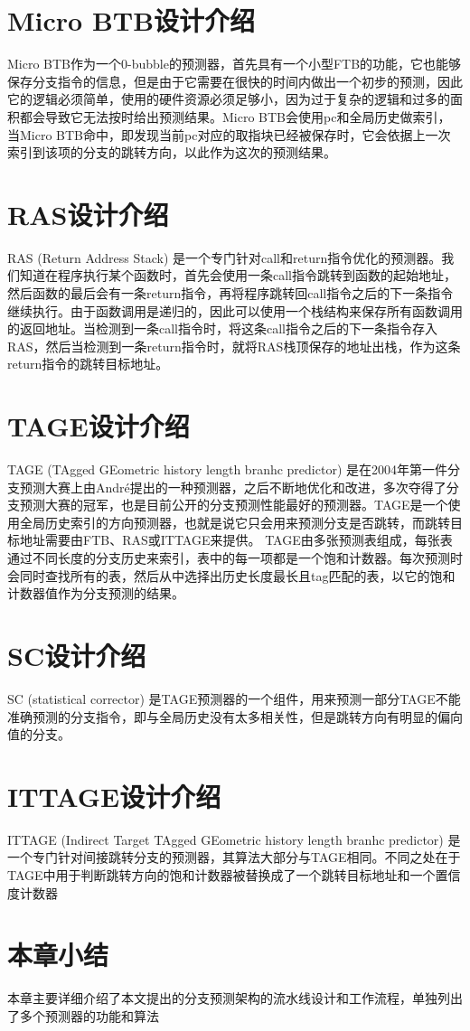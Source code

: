 \section{Micro BTB设计介绍}

Micro BTB作为一个0-bubble的预测器，首先具有一个小型FTB的功能，它也能够保存分支指令的信息，但是由于它需要在很快的时间内做出一个初步的预测，因此它的逻辑必须简单，使用的硬件资源必须足够小，因为过于复杂的逻辑和过多的面积都会导致它无法按时给出预测结果。Micro BTB会使用pc和全局历史做索引，当Micro BTB命中，即发现当前pc对应的取指块已经被保存时，它会依据上一次索引到该项的分支的跳转方向，以此作为这次的预测结果。

\section{RAS设计介绍}

RAS (Return Address Stack) 是一个专门针对call和return指令优化的预测器。我们知道在程序执行某个函数时，首先会使用一条call指令跳转到函数的起始地址，然后函数的最后会有一条return指令，再将程序跳转回call指令之后的下一条指令继续执行。由于函数调用是递归的，因此可以使用一个栈结构来保存所有函数调用的返回地址。当检测到一条call指令时，将这条call指令之后的下一条指令存入RAS，然后当检测到一条return指令时，就将RAS栈顶保存的地址出栈，作为这条return指令的跳转目标地址。

\section{TAGE设计介绍}

TAGE (TAgged GEometric history length branhc predictor) 是在2004年第一件分支预测大赛上由André提出的一种预测器，之后不断地优化和改进，多次夺得了分支预测大赛的冠军，也是目前公开的分支预测性能最好的预测器。TAGE是一个使用全局历史索引的方向预测器，也就是说它只会用来预测分支是否跳转，而跳转目标地址需要由FTB、RAS或ITTAGE来提供。
TAGE由多张预测表组成，每张表通过不同长度的分支历史来索引，表中的每一项都是一个饱和计数器。每次预测时会同时查找所有的表，然后从中选择出历史长度最长且tag匹配的表，以它的饱和计数器值作为分支预测的结果。

\section{SC设计介绍}

SC (statistical corrector) 是TAGE预测器的一个组件，用来预测一部分TAGE不能准确预测的分支指令，即与全局历史没有太多相关性，但是跳转方向有明显的偏向值的分支。

\section{ITTAGE设计介绍}

ITTAGE (Indirect Target TAgged GEometric history length branhc predictor) 是一个专门针对间接跳转分支的预测器，其算法大部分与TAGE相同。不同之处在于TAGE中用于判断跳转方向的饱和计数器被替换成了一个跳转目标地址和一个置信度计数器

\section{本章小结}

本章主要详细介绍了本文提出的分支预测架构的流水线设计和工作流程，单独列出了多个预测器的功能和算法